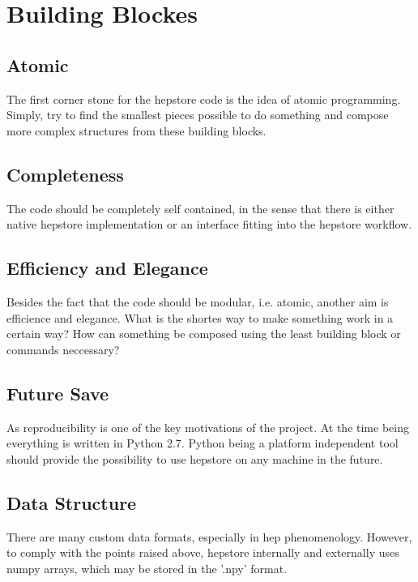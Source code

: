 
\section{Building Blockes}

\subsection{Atomic}
The first corner stone for the hepstore code is the idea of atomic
programming. Simply, try to find the smallest pieces possible to do
something and compose more complex structures from these building
blocks.

\subsection{Completeness}
The code should be completely self contained, in the sense that there
is either native hepstore implementation or an interface fitting into
the hepstore workflow.

\subsection{Efficiency and Elegance}
Besides the fact that the code should be modular, i.e. atomic, another
aim is efficience and elegance. What is the shortes way to make
something work in a certain way? How can something be composed using
the least building block or commands neccessary?

\subsection{Future Save}
As reproducibility is one of the key motivations of the project. At
the time being everything is written in Python 2.7. Python being a
platform independent tool should provide the possibility to use
hepstore on any machine in the future.

\subsection{Data Structure}
There are many custom data formats, especially in hep
phenomenology. However, to comply with the points raised above,
hepstore internally and externally uses numpy arrays, which may be
stored in the '.npy' format.

